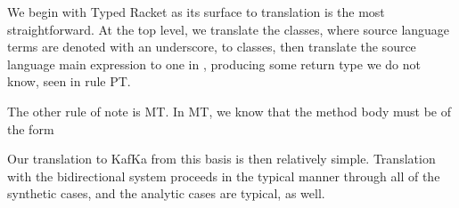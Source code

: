 \documentclass[a4paper,USenglish]{tex/lipics-v2016}
\begin{document}
We begin with Typed Racket as its surface to \kafka translation is the most straightforward. At the top level, we translate the classes, where source language terms are denoted with an underscore, to \kafka classes, then translate the source language main expression to one in \kafka, producing some return type we do not know, seen in rule PT.

The other rule of note is MT. In MT, we know that the method body must be of the form 

\begin{mathpar}



\end{mathpar}


\begin{mathpar}



\end{mathpar}

Our translation to KafKa from this basis is then relatively simple. Translation with the bidirectional system proceeds in the typical manner through all of the synthetic cases, and the analytic cases are typical, as well.
\end{document}
